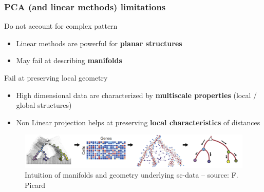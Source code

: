 \documentclass{beamer}\usepackage[]{graphicx}\usepackage[]{color}
\begin{document}
\begin{frame}
  \frametitle{PCA (and linear methods) limitations}

  \begin{block}{Do not account for complex pattern}
    \begin{itemize}
      \item Linear methods are powerful for \alert{\bf planar structures}
      \item May fail at describing \alert{\bf manifolds}
    \end{itemize}
  \end{block}
  
  \begin{block}{Fail at preserving local geometry}
    \begin{itemize}
      \item High dimensional data are characterized by \alert{\bf multiscale properties} (local / global structures)
      \item Non Linear projection helps at preserving \alert{\bf local characteristics} of distances
    \end{itemize}
  \end{block}

  \vfill
  
   \begin{figure}
     \includegraphics[scale=0.25]{figures/manifold.pdf}
     \caption{\small Intuition of manifolds and geometry underlying sc-data -- {\tiny source: F. Picard}}
   \end{figure}

\end{frame}
\end{document}
